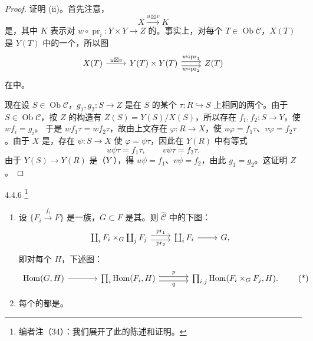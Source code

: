 \begin{proof}
证明 (ii)。首先注意，
\[
X\xrightarrow{u\mathbin{\boxtimes}v}K
\]
是，其中 $K$ 表示对 $w\circ\operatorname{pr}_i:Y\times Y\to Z$ 的。事实上，对每个 $T\in\operatorname{Ob}\mathcal C$，$X(T)$ 是 $Y(T)$ 中的一个，所以图
\[
\begin{tikzcd}
X(T)\arrow[r,"u\mathbin{\boxtimes}v"]&Y(T)\times Y(T)\arrow[r,shift left=.6ex,"w\circ\operatorname{pr}_1"]\arrow[r,shift right=.6ex,"w\circ\operatorname{pr}_2"']&Z(T)
\end{tikzcd}
\]
在中。

现在设 $S\in\operatorname{Ob}\mathcal C$，$g_1,g_2:S\to Z$ 是在 $S$ 的某个 $\tau:R\hookrightarrow S$ 上相同的两个。由于 $S\in\operatorname{Ob}\mathcal C$，按 $Z$ 的构造有 $Z(S)=Y(S)/X(S)$，所以存在 $f_1,f_2:S\to Y$，使 $wf_i=g_i$。
于是 $wf_1\tau=wf_2\tau$，故由上文存在 $\varphi:R\to X$，使 $u\varphi=f_1\tau$、$v\varphi=f_2\tau$。由于 $X$ 是，存在 $\psi:S\to X$ 使 $\varphi=\psi\tau$，因此在 $Y(R)$ 中有等式
\[
u\psi\tau=f_1\tau,\qquad v\psi\tau=f_2\tau.
\]
由于 $Y(S)\to Y(R)$ 是（$Y$ ），得 $u\psi=f_1$、$v\psi=f_2$，由此 $g_1=g_2$。这证明 $Z$ 。
\end{proof}
\begin{SGAresult}{}{4.4.6}
\footnote{编者注（34）：我们展开了此的陈述和证明。}
\begin{enumerate}
\item[(i)] 设 $\{F_i\xrightarrow{f_i}F\}$ 是一族，$G\subset F$ 是其。则 $\widehat{\mathcal C}$ 中的下图：
\[
\begin{tikzcd}
\coprod_iF_i\times_G\coprod_jF_j\arrow[r,shift left=.6ex,"\operatorname{pr}_1"]\arrow[r,shift right=.6ex,"\operatorname{pr}_2"']&\coprod_iF_i\arrow[r]&G,
\end{tikzcd}
\]
即对每个 $H$，下述图：
\[
\begin{tikzcd}[column sep=large]
\operatorname{Hom}(G,H)\arrow[r]&\prod_i\operatorname{Hom}(F_i,H)\arrow[r,shift left=.6ex,"p"]\arrow[r,shift right=.6ex,"q"']&\prod_{i,j}\operatorname{Hom}(F_i\times_G F_j,H).
\end{tikzcd}\tag{*}
\]
\item[(ii)] 每个的都是。
\end{enumerate}
\end{SGAresult}
